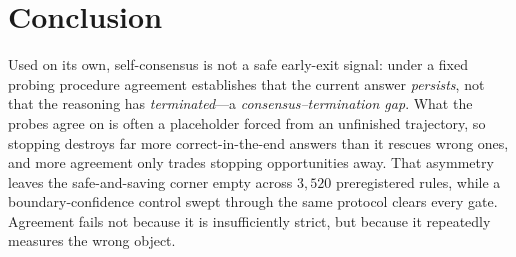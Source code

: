 \section{Conclusion}
\label{sec:conclusion}

Used on its own, self-consensus is not a safe early-exit signal: under a fixed
probing procedure agreement establishes that the current answer \emph{persists},
not that the reasoning has \emph{terminated}---a \emph{consensus--termination
gap}. What the probes agree on is often a placeholder forced from an unfinished
trajectory, so stopping destroys far more correct-in-the-end answers than it
rescues wrong ones, and more agreement only trades stopping opportunities
away. That asymmetry leaves the
safe-and-saving corner empty across $3{,}520$ preregistered rules, while a
boundary-confidence control swept through the same protocol clears every gate.
Agreement fails not because it is insufficiently strict, but because it
repeatedly measures the wrong object.
